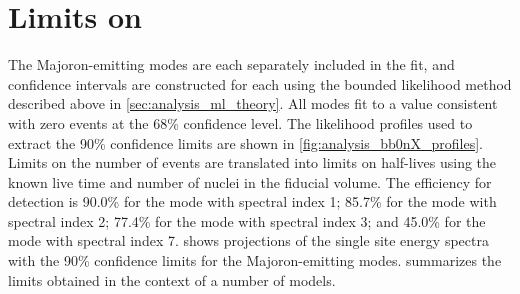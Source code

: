 \documentclass[herrin-thesis.tex]{subfiles}
\begin{document}
\section{Limits on \texorpdfstring{\zeronuXpX{}}{Majoron-emitting double beta decays}}
The Majoron-emitting modes are each separately included in the fit, and confidence intervals are constructed for each using the bounded likelihood method described above in \cref{sec:analysis_ml_theory}. All modes fit to a value consistent with zero events at the 68\% confidence level. The likelihood profiles used to extract the 90\% confidence limits are shown in \cref{fig:analysis_bb0nX_profiles}. Limits on the number of events are translated into limits on half-lives using the known live time and number of  nuclei in the fiducial volume. The efficiency for detection is 90.0\% for the mode with spectral index 1; 85.7\% for the mode with spectral index 2; 77.4\% for the mode with spectral index 3; and 45.0\% for the mode with spectral index 7.  shows projections of the single site energy spectra with the 90\% confidence limits for the Majoron-emitting modes.  summarizes the limits obtained in the context of a number of models.
\end{document}
